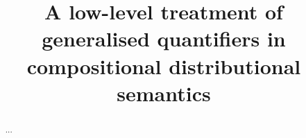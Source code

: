\documentclass[a4paper,11pt]{llncs}
\title{A low-level treatment of generalised quantifiers in  compositional distributional semantics}
\author{}
\institute{
\email{}}
\begin{document}
\maketitle
\begin{abstract}...
\end{abstract}























\end{document}
